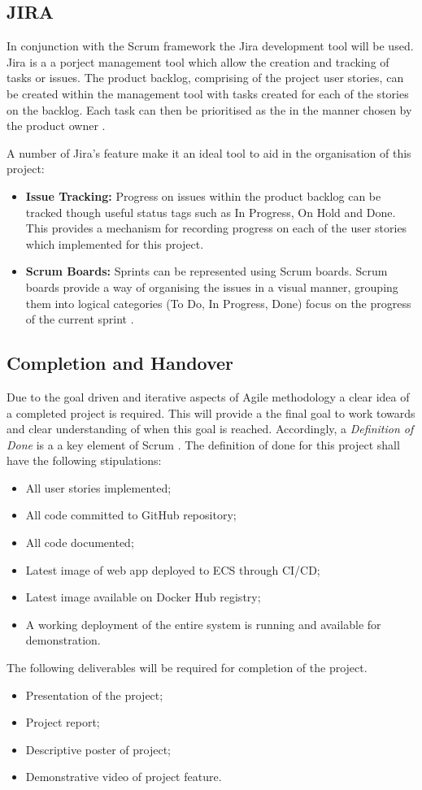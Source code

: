	\subsection{JIRA}
	In conjunction with the Scrum framework the Jira development tool will be used. Jira is a a porject management tool which allow the creation and tracking of tasks or issues. The product backlog, comprising of the project user stories, can be created within the management tool with tasks created for each of the stories on the backlog. Each task can then be prioritised as the in the manner chosen by the product owner \citep{jira}.
	
	A number of Jira's feature make it an ideal tool to aid in the organisation of this project:
	\begin{itemize}
		\item \textbf{Issue Tracking:} Progress on issues within the product backlog can be tracked though useful status tags such as In Progress, On Hold and Done. This provides a mechanism for recording progress on each of the user stories which implemented for this project. 
		\item \textbf{Scrum Boards: } Sprints can be represented using Scrum boards. Scrum boards provide a way of organising the issues in a visual manner, grouping them into logical categories (To Do, In Progress, Done) focus on the progress of the current sprint \cite{scruminc}.
	\end{itemize}
	
	\subsection{Completion and Handover}
	Due to the goal driven and iterative aspects of Agile methodology a clear idea of a completed project is required. This will provide a the final goal to work towards and clear understanding of when this goal is reached. Accordingly, a \textit{Definition of Done} is a a key element of Scrum \citep{panchal}. The definition of done for this project shall have the following stipulations:
	\begin{itemize}
		\item All user stories implemented;
		\item All code committed to GitHub repository;
		\item All code documented;
		\item Latest image of web app deployed to ECS through CI/CD;
		\item Latest image available on Docker Hub registry;
		\item A working deployment of the entire system is running and available for demonstration.
	\end{itemize}
	 
	 The following deliverables will be required for completion of the project. 
	 \begin{itemize}
	 	\item Presentation of the project;
	 	\item Project report;
	 	\item Descriptive poster of project;
	 	\item Demonstrative video of project feature.
	 \end{itemize}